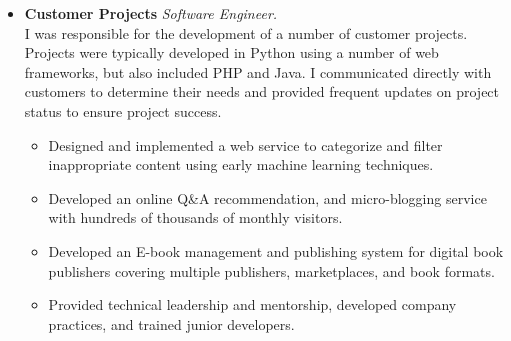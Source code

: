 \documentclass{article}
\begin{document}
\begin{list}{}{
    \setlength{\leftmargin}{0cm}	%
    \setlength{\parsep}{0.15cm}
}
\begin{itemize}
\begin{itemize}
            \item Designed and implemented the service's lightweight modular
                frontend architecture using Backbone.js, CoffeeScript, and
                RequireJS.\@

            \item Designed and implemented a unique system using Redis to cache
                contacts from third-party social networks and email notification
                system to aid in the service's organic growth.

            \item Designed and implemented the service architecture on AWS
                including load balancing, caching, and database replication.

            \item Efficiently handled large load spikes as popular events were
                published with thousands of users concurrently registering.

        \end{itemize}


        \item \textbf{Customer Projects} \emph{Software Engineer.}\\
            I was responsible for the development of a number of customer
            projects. Projects were typically developed in Python using a number
            of web frameworks, but also included PHP and Java. I communicated
            directly with customers to determine their needs and provided
            frequent updates on project status to ensure project success.

        \begin{itemize}

            \item Designed and implemented a web service to categorize and
                filter inappropriate content using early machine learning
                techniques.

            \item Developed an online Q\&A recommendation, and micro-blogging
                service with hundreds of thousands of monthly visitors.

            \item Developed an E-book management and publishing system for
                digital book publishers covering multiple publishers,
                marketplaces, and book formats.

            \item Provided technical leadership and mentorship, developed
                company practices, and trained junior developers.


\end{itemize}
\end{itemize}
\end{list}
\end{document}
